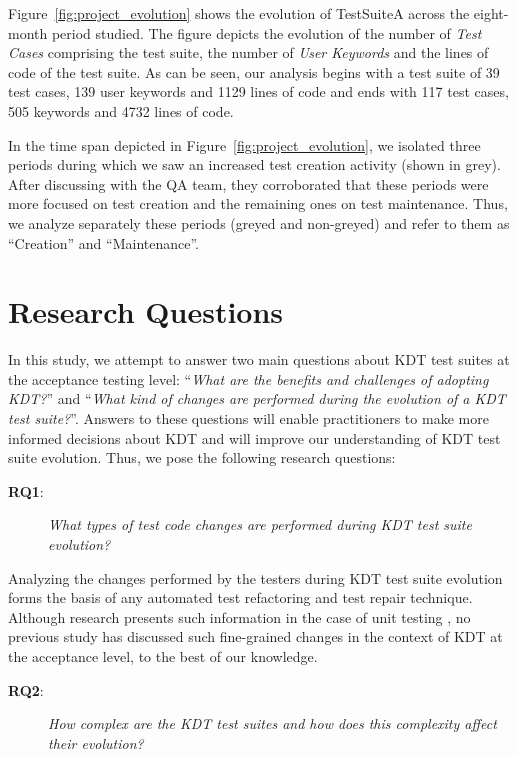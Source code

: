 Figure~\ref{fig:project_evolution} shows the evolution of TestSuiteA across the eight-month period studied. The figure depicts the evolution of the number of \emph{Test Cases} comprising the test suite, the number of \emph{User Keywords} and the lines of code of the test suite. As can be seen, our analysis begins with a test suite of 39 test cases, 139 user keywords and 1129 lines of code and ends with 117 test cases, 505 keywords and 4732 lines of code.

In the time span depicted in Figure~\ref{fig:project_evolution}, we isolated three periods during which we saw an increased test creation activity (shown in grey). After discussing with the QA team, they corroborated that these periods were more focused on test creation and the remaining ones on test maintenance. Thus, we analyze separately these periods (greyed and non-greyed) and refer to them as ``Creation'' and ``Maintenance''.

\section{Research Questions}

In this study, we attempt to answer two main questions about KDT test suites at the acceptance testing level: ``\emph{What are the benefits and challenges of adopting KDT?}''  and ``\emph{What kind of changes are performed during the evolution of a KDT test suite?}''. Answers to these questions will enable practitioners to make more informed decisions about KDT and will improve our understanding of KDT test suite evolution. Thus, we pose the following research questions:

\begin{description}
\item[\textbf{RQ1}:] \emph{What types of test code changes are performed during KDT test suite evolution?}
\end{description}

Analyzing the changes performed by the testers during KDT test suite evolution forms the basis of any automated test refactoring and test repair technique. Although research presents such information in the case of unit testing \cite{Pinto2012}, no previous study has discussed such fine-grained changes in the context of KDT at the acceptance level, to the best of our
knowledge.

\begin{description}
\item[\textbf{RQ2}:] \emph{How complex are the KDT test suites and how does this complexity affect their evolution?}
\end{description}

